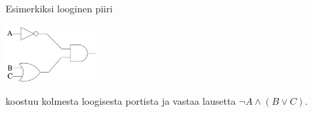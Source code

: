 \begin{tehtavasivu}
\begin{center}
\begin{tabular}{|>{\centering}m{1.5cm}|>{\raggedright}m{3.8cm}|c|>{\centering\arraybackslash}m{2cm}|}
        \end{tabular}

        \end{center}

        \normalsize


        \bigskip

        Esimerkiksi looginen piiri

        \medskip

        \begin{center}
        \includegraphics[width=3.5cm]{pictures/boole/boolesim-ABC}
        \end{center}

        \medskip
        \noindent
        koostuu kolmesta loogisesta portista ja vastaa
        lausetta \mbox{$\lnot A\land (B \lor C)$}. %
        \newpage


\end{tehtavasivu}
